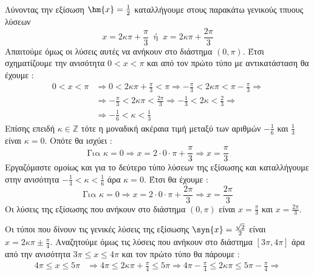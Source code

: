 \lysh\\
\begin{rlist}
\item Λύνοντας την εξίσωση $ \hm{x}=\frac{1}{2} $ καταλλήγουμε στους παρακάτω γενικούς τπυους λύσεων
\[ x=2\kappa\pi+\frac{\pi}{3}\ \textrm{ ή }\ x=2\kappa\pi+\frac{2\pi}{3} \]
Απαιτούμε όμως οι λύσεις αυτές να ανήκουν στο διάστημα $ (0,\pi) $. Έτσι σχηματίζουμε την ανισότητα $ 0<x<\pi $ και από τον πρώτο τύπο με αντικατάσταση θα έχουμε :
\begin{align*}
0<x<\pi&\Rightarrow 0<2\kappa\pi+\frac{\pi}{3}<\pi\Rightarrow -\frac{\pi}{3}<2\kappa\pi<\pi-\frac{\pi}{3}\Rightarrow\\
&\Rightarrow -\frac{\pi}{3}<2\kappa\pi<\frac{2\pi}{3}\Rightarrow -\frac{1}{3}<2\kappa<\frac{2}{3}\Rightarrow\\
&\Rightarrow -\frac{1}{6}<\kappa<\frac{1}{3}
\end{align*}
Επίσης επειδή $ \kappa\in\mathbb{Z} $ τότε η μοναδική ακέραια τιμή μεταξύ των αριθμών $ -\frac{1}{6} $ και $ \frac{1}{3} $ είναι $ \kappa=0 $. Οπότε θα ισχύει :
\[ \textrm{Για }\kappa=0\Rightarrow x=2\cdot0\cdot\pi+\frac{\pi}{3}\Rightarrow x=\frac{\pi}{3}\]
Εργαζόμαστε ομοίως και για το δεύτερο τύπο λύσεων της εξίσωσης και καταλλήγουμε στην ανισότητα $ -\frac{1}{3}<\kappa<\frac{1}{6} $ άρα $ \kappa=0 $. Έτσι θα έχουμε :
\[ \textrm{Για }\kappa=0\Rightarrow x=2\cdot0\cdot\pi+\frac{2\pi}{3}\Rightarrow x=\frac{2\pi}{3}\]
Οι λύσεις της εξίσωσης που ανήκουν στο διάστημα $ (0,\pi) $ είναι $ x=\frac{\pi}{3} $ και $ x=\frac{2\pi}{3} $.
\item Οι τύποι που δίνουν τις γενικές λύσεις της εξίσωσης $ \syn{x}=\frac{\sqrt{2}}{2} $ είναι $ x=2\kappa\pi\pm\frac{\pi}{4} $. Αναζητούμε όμως τις λύσεις που ανήκουν στο διάστημα $ [3\pi,4\pi] $ άρα από την ανισότητα $ 3\pi\leq x\leq 4\pi $ και τον πρώτο τύπο θα πάρουμε :
\begin{align*}
4\pi\leq x\leq 5\pi&\Rightarrow 4\pi\leq 2\kappa\pi+\frac{\pi}{4}\leq 5\pi\Rightarrow 4\pi-\frac{\pi}{4}\leq 2\kappa\pi\leq 5\pi-\frac{\pi}{4}\Rightarrow\\

\end{align*}
\end{rlist}
